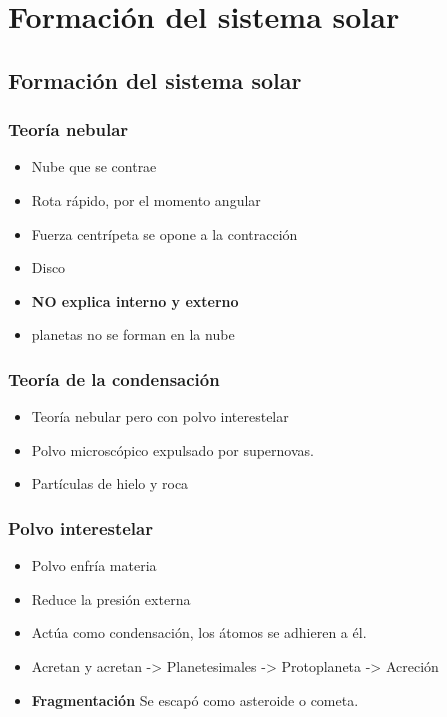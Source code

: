 \documentclass[11pt,fleqn]{book} %
\begin{document}

\chapter{Formación del sistema solar}

\section{Formación del sistema solar}
\subsection{Teoría nebular}
\begin{itemize}
    \item Nube que se contrae
    \item Rota rápido, por el momento angular
    \item Fuerza centrípeta se opone a la contracción 
    \item Disco 
    \item \textbf{NO explica interno y externo}
    \item planetas no se forman en la nube
\end{itemize}

\subsection{Teoría de la condensación}
\begin{itemize}
    \item Teoría nebular pero con polvo interestelar 
    \item Polvo microscópico expulsado por supernovas.
    \item Partículas de hielo y roca 
\end{itemize}

\subsection{Polvo interestelar}
\begin{itemize}
    \item Polvo enfría materia
    \item Reduce la presión externa 
    \item Actúa como condensación, los átomos se adhieren a él.
    \item Acretan y acretan -> Planetesimales -> Protoplaneta -> Acreción
    \item \textbf{Fragmentación} Se escapó como asteroide o cometa.
\end{itemize}
\end{document}
